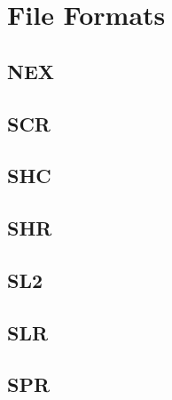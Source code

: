 \chapter{File Formats}
\section{NEX}
\section{SCR}
\section{SHC}
\section{SHR}
\section{SL2}
\section{SLR}
\section{SPR}
